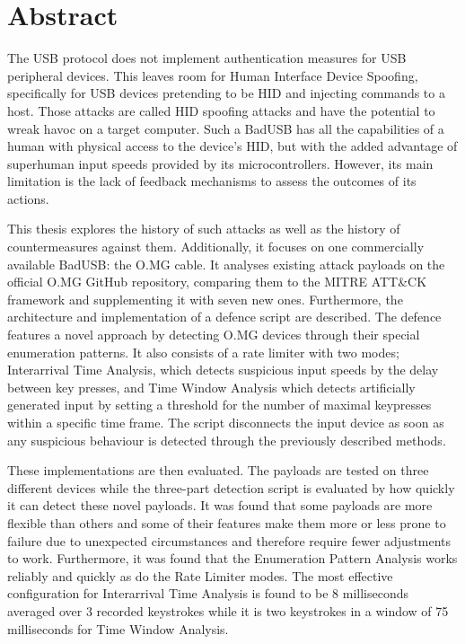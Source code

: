 \chapter*{Abstract}


The USB protocol does not implement authentication measures for USB peripheral devices. This leaves room for Human Interface Device Spoofing, specifically for USB
devices pretending to be HID and injecting commands to a host. Those attacks are called
HID spoofing attacks and have the potential to wreak havoc on a target computer. Such a
BadUSB has all the capabilities of a human with physical access to the device’s HID, but
with the added advantage of superhuman input speeds provided by its microcontrollers.
However, its main limitation is the lack of feedback mechanisms to assess the outcomes
of its actions. 

This thesis explores the history of such attacks as well as the history of
countermeasures against them. Additionally, it focuses on one commercially available BadUSB: the O.MG cable. It analyses existing attack payloads on the official O.MG
GitHub repository, comparing them to the MITRE ATT\&CK framework and supplementing it with seven new ones. Furthermore, the architecture and implementation of a
defence script are described. The defence features a novel approach by detecting O.MG devices through their special enumeration patterns. It also consists of a rate limiter with two modes; Interarrival Time Analysis, which detects suspicious input speeds by the delay between key presses,
and Time Window Analysis which detects artificially generated input by setting a threshold for the number of maximal keypresses within a specific time frame. The script disconnects the input
device as soon as any suspicious behaviour is detected through the previously described
methods.

These implementations are then evaluated. The payloads are tested on three different devices while the three-part detection script is evaluated by how quickly it can detect these
novel payloads. It was found that some payloads are more flexible than others and some of
their features make them more or less prone to failure due to unexpected circumstances and therefore require fewer adjustments to work. Furthermore, it was found that the Enumeration Pattern Analysis works reliably and quickly as do the Rate Limiter modes. The most effective configuration for Interarrival Time Analysis is found to be 8 milliseconds averaged over 3 recorded keystrokes while it is two keystrokes in a window of 75 milliseconds for Time Window Analysis.

